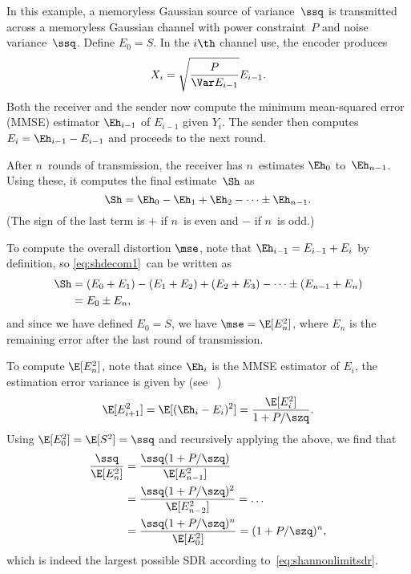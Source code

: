 \begin{example}
  \label{ex:gaussfb}
  In this example, a memoryless Gaussian source of variance~$\ssq$ is
  transmitted across a memoryless Gaussian channel with power constraint~$P$ and
  noise variance~$\ssq$.  Define $E_0 = S$. In the $i\th$ channel use, the
  encoder produces
  \begin{equation}
    \label{eq:gaussfbxi}
    X_i = \sqrt{\frac{P}{\Var E_{i-1}}} E_{i-1}.
  \end{equation}
  Both the receiver and the sender now compute the minimum mean-squared
  error (MMSE) estimator $\Eh_{i-1}$ of $E_{i-1}$ given $Y_i$. The sender then
  computes $E_i = \Eh_{i-1} - E_{i-1}$ and proceeds to the next round.

  After $n$~rounds of transmission, the receiver has $n$~estimates $\Eh_0$
  to~$\Eh_{n-1}$. Using these, it computes the final estimate~$\Sh$ as
  \begin{equation}
    \label{eq:shdecom1}
    \Sh = \Eh_0 - \Eh_1 + \Eh_2 - \cdots \pm \Eh_{n-1}.
  \end{equation}
  (The sign of the last term is $+$ if $n$~is even and $-$ if $n$~is odd.)

  To compute the overall distortion $\mse$, note that $\Eh_{i-1} = E_{i-1} +
  E_i$ by definition, so \eqref{eq:shdecom1}~can be written as
  \begin{align*}
    \Sh &= (E_0 + E_1) - (E_1 + E_2) + (E_2 + E_3) - \cdots \pm (E_{n-1} + E_n)
    \\
    &= E_0 \pm E_n,
  \end{align*}
  and since we have defined $E_0 = S$, we have $\mse = \E[E_n^2]$, where $E_n$
  is the remaining error after the last round of transmission.

  To compute $\E[E_n^2]$, note that since $\Eh_i$ is the MMSE estimator of
  $E_i$, the estimation error variance is given by (see
  \eg~\cite[Section~8.3]{Scharf1990})
  \begin{equation}
    \label{eq:gaussvardec}
    \E[E_{i+1}^2] = \E[(\Eh_i - E_i)^2] = \frac{\E[E_i^2]}{1 + P/\szq}.
  \end{equation}
  Using $\E[E_0^2] = \E[S^2] = \ssq$ and recursively applying the above, we find
  that
  \begin{align*}
    \frac{\ssq}{\E[E_n^2]} &= \frac{\ssq (1 + P/\szq)}{\E[E_{n-1}^2]} \\
    &= \frac{\ssq(1 + P/\szq)^2}{\E[E_{n-2}^2]} = \dots \\
    &= \frac{\ssq(1 + P/\szq)^n}{\E[E_0^2]} = (1 + P/\szq)^n,
  \end{align*}
  which is indeed the largest possible SDR according
  to~\eqref{eq:shannonlimitsdr}.
\end{example}


